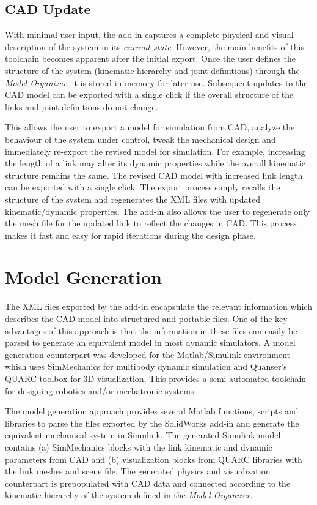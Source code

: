 \subsection{CAD Update} %
\label{sub:cad_update}
With minimal user input, the add-in captures a complete physical and visual description of the system in its \emph{current state}. However, the main benefits of this toolchain becomes apparent after the initial export. Once the user defines the structure of the system (kinematic hierarchy and joint definitions) through the \emph{Model Organizer}, it is stored in memory for later use. Subsequent updates to the CAD model can be exported with a single click if the overall structure of the links and joint definitions do not change.

This allows the user to export a model for simulation from CAD, analyze the behaviour of the system under control, tweak the mechanical design and immediately re-export the revised model for simulation. For example, increasing the length of a link may alter its dynamic properties  while the overall kinematic structure remains the same. The revised CAD model with increased link length can be exported with a single click. The export process simply recalls the structure of the system and regenerates the XML files with updated kinematic/dynamic properties. The add-in also allows the user to regenerate only the mesh file for the updated link to reflect the changes in CAD. This process makes it fast and easy for rapid iterations during the design phase.


\section{Model Generation} %
\label{sec:model_generation}

The XML files exported by the add-in encapsulate the relevant information which describes the CAD model into structured and portable files. One of the key advantages of this approach is that the information in these files can easily be parsed to generate an equivalent model in most dynamic simulators. A model generation counterpart was developed for the Matlab/Simulink environment which uses SimMechanics for multibody dynamic simulation and Quanser's QUARC toolbox for 3D visualization. This provides a semi-automated toolchain for designing robotics and/or mechatronic systems.

The model generation approach provides several Matlab functions, scripts and libraries to parse the files exported by the SolidWorks add-in and generate the equivalent mechanical system in Simulink. The generated Simulink model contains (a) SimMechanics blocks with the link kinematic and dynamic parameters from CAD and (b) visualization blocks from QUARC libraries with the link meshes and scene file. The generated physics and visualization counterpart is prepopulated with CAD data and connected according to the kinematic hierarchy of the system defined in the \emph{Model Organizer}.

